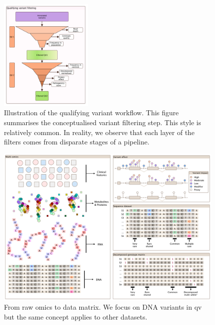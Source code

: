 \begin{figure}[h]
\centering
     \includegraphics[width=0.4\textwidth]{./images/qv_filter_pyramid_vcurrent.pdf}
\caption{Illustration of the qualifying variant workflow. This figure summarises the conceptualised variant filtering step. This style is relatively common. In reality, we observe that each layer of the filters comes from disparate stages of a pipeline.}
    \label{fig:qv_filter_pyramid_vcurrent}
\end{figure}

\begin{figure}[h]
    \centering
   \includegraphics[width=0.99\textwidth]{./images/candidate_variants_sequence_to_matrix.pdf}
    \caption{From raw omics to data matrix.  We focus on DNA variants in \ac{qv} but the same concept applies to other datasets.}
    \label{fig:candidate_variants_sequence_to_matrix}
\end{figure}



